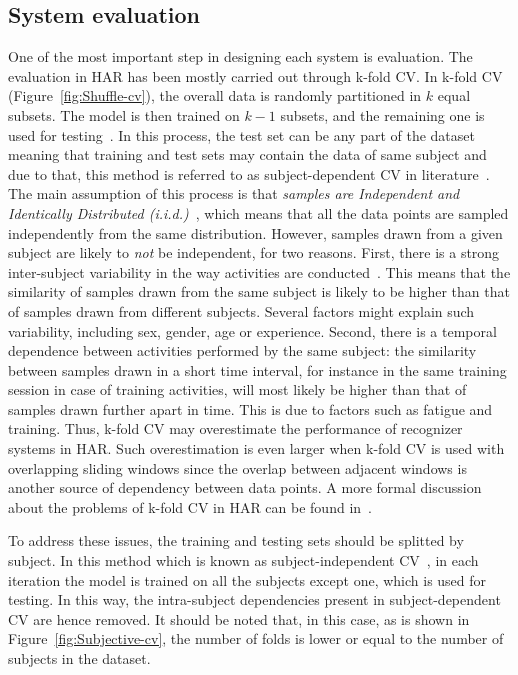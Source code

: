 \documentclass[sensors,article,submit,moreauthors,pdftex]{Definitions/mdpi}
\begin{document}
\subsection{System evaluation}
\label{sub:CVs}
One of the most important step in designing each system is evaluation. The evaluation in HAR has been mostly carried out through k-fold CV. In k-fold CV (Figure~\ref{fig:Shuffle-cv}), the overall data is randomly partitioned in $k$ equal subsets. The model is then trained on $k-1$ subsets, and the remaining one is used for testing~\cite{trevor2009elements}. In this process, the test set can be any part of the dataset meaning that training and test sets may contain the data of same subject and due to that, this method is referred to as subject-dependent CV in literature~\cite{al2019deep}.  
The main assumption of this process is that \emph{samples are Independent and Identically Distributed (i.i.d.)}~\cite{arlot2010survey}, which means that all the data points are sampled independently from the same distribution.  However, samples drawn from a given subject are likely to \emph{not} be independent, for two reasons. First, there is a strong inter-subject variability in the way activities are conducted~\cite{bulling2014tutorial}. This means that the similarity of samples drawn from the same subject is likely to be higher than that of samples drawn from different subjects. Several factors might explain such variability, including sex, gender, age or experience. Second, there is a temporal dependence between activities performed by the same subject: the similarity between samples drawn in a short time interval, for instance in the same training session in case of training activities, will most likely be higher than that of samples drawn further apart in time. This is due to factors such as fatigue and training. Thus, k-fold CV may overestimate the performance of recognizer systems in HAR. Such overestimation is even larger when k-fold CV is used with overlapping sliding windows since the overlap between adjacent windows is another source of dependency between data points. A more formal discussion about the problems of k-fold CV in HAR can be found in~\cite{dehghani2019subject}.   


To address these issues, the training and testing sets should be splitted by subject. In this method which is known as subject-independent CV~\cite{al2019deep,janidarmian2017comprehensive}, in each iteration the model is trained on all the subjects except one, which is used for testing. In this way, the intra-subject dependencies present in subject-dependent CV are hence removed. It should be noted that, in this case, as is shown in Figure~\ref{fig:Subjective-cv}, the number of folds is lower or equal to the number of subjects in the dataset.    
\end{document}
